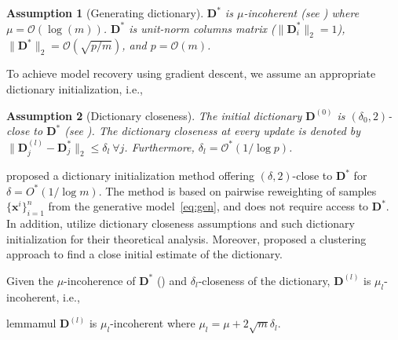 \documentclass[10pt]{article} %
\newtheorem{assumption}{Assumption}[section]
\newcommand{\D}{{\bm D}}
\newcommand{\x}{{\bm x}}
\begin{document}
\begin{assumption}[Generating dictionary]\label{assum:d}
$\D^{\ast}$ is $\mu$-incoherent (see ) where $\mu = \mathcal{O}(\log{(m)})$. $\D^{\ast}$ is unit-norm columns matrix ($\| \D_i^{\ast} \|_2 = 1$), $\| \D^{\ast} \|_2 = \mathcal{O}(\sqrt{p/m})$, and $p = \mathcal{O}(m)$.
\end{assumption}
%
To achieve model recovery using gradient descent, we assume an appropriate dictionary initialization, i.e.,
\begin{assumption}[Dictionary closeness]\label{assum:closeness}
The initial dictionary $\D^{(0)}$ is $(\delta_{0}, 2)$-close to $\D^{\ast}$  (see ). The dictionary closeness at every update is denoted by $\| \D_j^{(l)} - \D_j^{\ast} \|_2 \leq \delta_l\ \forall j$. Furthermore, $\delta_l = \mathcal{O}^{\ast}(1 / \log{p})$.
\end{assumption}

\citet{arora2015sparsecoding} proposed a dictionary initialization method offering $(\delta, 2)$-close to ${\bm D}^{\ast}$ for $\delta = O^{\ast}(1 / \log m)$. The method is based on pairwise reweighting of samples $\{\x^i\}_{i=1}^n$ from the generative model~\eqref{eq:gen}, and does not require access to $\D^{\ast}$. In addition,  \citet{rambhatla2018noodl} utilize dictionary closeness assumptions and such dictionary initialization for their theoretical analysis. Moreover, \citet{Agarwal2017dictcluster} proposed a clustering approach to find a close initial estimate of the dictionary.

Given the $\mu$-incoherence of $\D^{\ast}$ () and $\delta_l$-closeness of the dictionary, $\D^{(l)}$ is $\mu_l$-incoherent, i.e.,
%
\begin{restatable}[$\mu_l$-incoherent]{lemma}{mul}\label{lemma:mul}
$\D^{(l)}$ is $\mu_l$-incoherent where $\mu_l = \mu + 2 \sqrt{m} \delta_l$.
\end{restatable}
\end{document}
